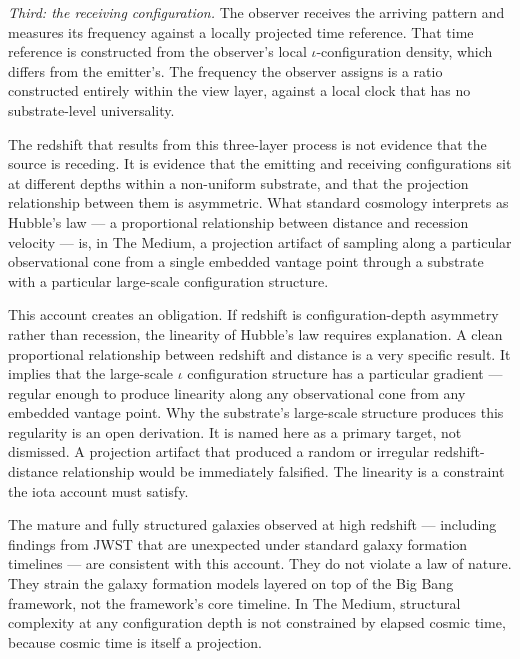 \documentclass[11pt,letterpaper]{article}
\begin{document}
\emph{Third: the receiving configuration.} The observer receives the arriving pattern and measures its frequency against a locally projected time reference. That time reference is constructed from the observer's local \(\iota\)-configuration density, which differs from the emitter's. The frequency the observer assigns is a ratio constructed entirely within the view layer, against a local clock that has no substrate-level universality.

The redshift that results from this three-layer process is not evidence that the source is receding. It is evidence that the emitting and receiving configurations sit at different depths within a non-uniform substrate, and that the projection relationship between them is asymmetric. What standard cosmology interprets as Hubble's law --- a proportional relationship between distance and recession velocity --- is, in The Medium, a projection artifact of sampling along a particular observational cone from a single embedded vantage point through a substrate with a particular large-scale configuration structure.

This account creates an obligation. If redshift is configuration-depth asymmetry rather than recession, the linearity of Hubble's law requires explanation. A clean proportional relationship between redshift and distance is a very specific result. It implies that the large-scale \(\iota\) configuration structure has a particular gradient --- regular enough to produce linearity along any observational cone from any embedded vantage point. Why the substrate's large-scale structure produces this regularity is an open derivation. It is named here as a primary target, not dismissed. A projection artifact that produced a random or irregular redshift-distance relationship would be immediately falsified. The linearity is a constraint the iota account must satisfy.

The mature and fully structured galaxies observed at high redshift --- including findings from JWST that are unexpected under standard galaxy formation timelines --- are consistent with this account. They do not violate a law of nature. They strain the galaxy formation models layered on top of the Big Bang framework, not the framework's core timeline. In The Medium, structural complexity at any configuration depth is not constrained by elapsed cosmic time, because cosmic time is itself a projection.
\end{document}
